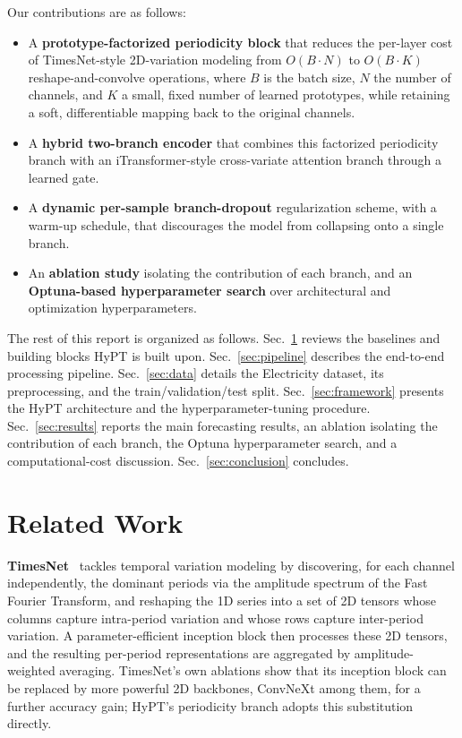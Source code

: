 \documentclass[10pt,journal]{IEEEtran}
\newcommand{\secref}[1]{Sec.~\ref{#1}}
\begin{document}
Our contributions are as follows:
\begin{itemize}
\item A \textbf{prototype-factorized periodicity block} that reduces the per-layer cost of TimesNet-style 2D-variation modeling from $O(B\!\cdot\!N)$ to $O(B\!\cdot\!K)$ reshape-and-convolve operations, where $B$ is the batch size, $N$ the number of channels, and $K$ a small, fixed number of learned prototypes, while retaining a soft, differentiable mapping back to the original channels.
\item A \textbf{hybrid two-branch encoder} that combines this factorized periodicity branch with an iTransformer-style cross-variate attention branch through a learned gate.
\item A \textbf{dynamic per-sample branch-dropout} regularization scheme, with a warm-up schedule, that discourages the model from collapsing onto a single branch.
\item An \textbf{ablation study} isolating the contribution of each branch, and an \textbf{Optuna-based hyperparameter search} over architectural and optimization hyperparameters.
\end{itemize}

The rest of this report is organized as follows. \secref{sec:related} reviews the baselines and building blocks HyPT is built upon. \secref{sec:pipeline} describes the end-to-end processing pipeline. \secref{sec:data} details the Electricity dataset, its preprocessing, and the train/validation/test split. \secref{sec:framework} presents the HyPT architecture and the hyperparameter-tuning procedure. \secref{sec:results} reports the main forecasting results, an ablation isolating the contribution of each branch, the Optuna hyperparameter search, and a computational-cost discussion. \secref{sec:conclusion} concludes.

\section{Related Work}
\label{sec:related}

\textbf{TimesNet}~\cite{timesnet} tackles temporal variation modeling by discovering, for each channel independently, the dominant periods via the amplitude spectrum of the Fast Fourier Transform, and reshaping the 1D series into a set of 2D tensors whose columns capture intra-period variation and whose rows capture inter-period variation. A parameter-efficient inception block then processes these 2D tensors, and the resulting per-period representations are aggregated by amplitude-weighted averaging. TimesNet's own ablations show that its inception block can be replaced by more powerful 2D backbones, ConvNeXt among them, for a further accuracy gain; HyPT's periodicity branch adopts this substitution directly.
\end{document}

